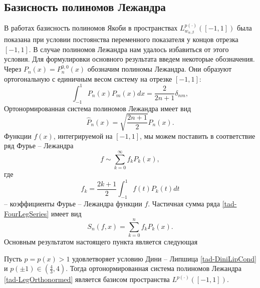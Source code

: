 \subsection{Базисность полиномов Лежандра}
В работах \cite{tad-SHII-Leg,tad-SHII-Jacob,tad-SHII-Ult,tad-RAM-Jacob} базисность полиномов Якоби в пространствах $L^{p(\cdot)}_{w_{\alpha,\beta}}([-1,1])$ была показана при условии постоянства переменного показателя у концов отрезка $[-1,1]$. В случае полиномов Лежандра нам удалось избавиться от этого условия. Для формулировки основного результата введем некоторые обозначения. Через $P_n(x)=P^{0,0}_n(x)$ обозначим полиномы Лежандра.
Они образуют ортогональную с единичным весом систему на отрезке $[-1,1]$:
\begin{equation*}
  \int_{-1}^1P_n(x)P_m(x)dx=\frac{2}{2n+1}\delta_{nm},
\end{equation*}
Ортонормированная система полиномов Лежандра имеет вид
\begin{equation}\label{tad-LegOrthonormed}
  \hat{P}_n(x)=\sqrt{\frac{2n+1}{2}}P_n(x).
\end{equation}
Функции $f(x)$, интегрируемой на $[-1,1]$, мы можем поставить в соответствие ряд Фурье -- Лежандра
\begin{equation}\label{tad-FourLegSeries}
  f\sim\sum_{k=0}^\infty f_kP_k(x),
\end{equation}
где
\begin{equation*}
  f_k=\frac{2k+1}{2}\int_{-1}^1f(t)P_k(t)dt
\end{equation*}
-- коэффициенты Фурье -- Лежандра функции $f$. Частичная сумма ряда \eqref{tad-FourLegSeries} имеет вид
\begin{equation*}
  S_n(f,x)=\sum_{k=0}^n f_kP_k(x).
\end{equation*}
Основным результатом настоящего пункта является следующая
\begin{theorem}
	Пусть $p=p(x)>1$ удовлетворяет условию Дини -- Липшица \eqref{tad-DiniLipCond} и $p(\pm1)\in(\frac43,4)$. Тогда ортонормированная система полиномов Лежандра \eqref{tad-LegOrthonormed} является базисом пространства $L^{p(\cdot)}([-1,1])$.
\end{theorem}

